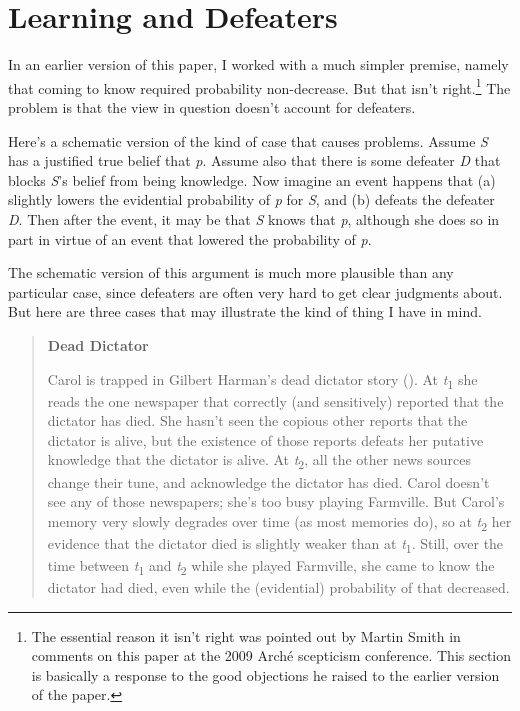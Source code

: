 \documentclass[
  10pt,
  letterpaper,
  DIV=11,
  numbers=noendperiod,
  twoside]{scrartcl}
\begin{document}
\section{Learning and Defeaters}\label{learning-and-defeaters}

In an earlier version of this paper, I worked with a much simpler
premise, namely that coming to know required probability non-decrease.
But that isn't right.\footnote{The essential reason it isn't right was
  pointed out by Martin Smith in comments on this paper at the 2009
  Arché scepticism conference. This section is basically a response to
  the good objections he raised to the earlier version of the paper.}
The problem is that the view in question doesn't account for defeaters.

Here's a schematic version of the kind of case that causes problems.
Assume \emph{S} has a justified true belief that \emph{p}. Assume also
that there is some defeater \emph{D} that blocks \emph{S}'s belief from
being knowledge. Now imagine an event happens that (a) slightly lowers
the evidential probability of \emph{p} for \emph{S}, and (b) defeats the
defeater \emph{D}. Then after the event, it may be that \emph{S} knows
that \emph{p}, although she does so in part in virtue of an event that
lowered the probability of \emph{p}.

The schematic version of this argument is much more plausible than any
particular case, since defeaters are often very hard to get clear
judgments about. But here are three cases that may illustrate the kind
of thing I have in mind.

\begin{quote}
\textbf{Dead Dictator}

Carol is trapped in Gilbert Harman's dead dictator story
(). At
\emph{t}\textsubscript{1} she reads the one newspaper that correctly
(and sensitively) reported that the dictator has died. She hasn't seen
the copious other reports that the dictator is alive, but the existence
of those reports defeats her putative knowledge that the dictator is
alive. At \emph{t}\textsubscript{2}, all the other news sources change
their tune, and acknowledge the dictator has died. Carol doesn't see any
of those newspapers; she's too busy playing Farmville. But Carol's
memory very slowly degrades over time (as most memories do), so at
\emph{t}\textsubscript{2} her evidence that the dictator died is
slightly weaker than at \emph{t}\textsubscript{1}. Still, over the time
between \emph{t}\textsubscript{1} and \emph{t}\textsubscript{2} while
she played Farmville, she came to know the dictator had died, even while
the (evidential) probability of that decreased.
\end{quote}
\end{document}
